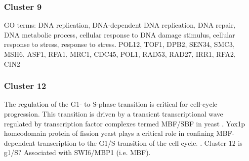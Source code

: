 \documentclass[]{article}
\begin{document}



%
%


\subsubsection{Cluster 9}
GO terms: DNA replication, DNA-dependent DNA replication, DNA repair, DNA metabolic process, cellular response to DNA damage stimulus, cellular response to stress, response to stress. 
POL12, TOF1, DPB2, SEN34, SMC3, MSH6, ASF1, RFA1, MRC1, CDC45, POL1, RAD53, RAD27, IRR1, RFA2, CIN2

\subsubsection{Cluster 12}
The regulation of the G1- to S-phase transition is critical for cell-cycle progression. This transition is driven by a transient transcriptional wave regulated by transcription factor complexes termed MBF/SBF in yeast \cite{aligianni2009fission}.
Yox1p homeodomain protein of fission yeast plays a critical role in confining MBF-dependent transcription to the G1/S transition of the cell cycle. \cite{aligianni2009fission}. Cluster 12 is g1/S? Associated with SWI6/MBP1 (i.e. MBF). 
\end{document}
